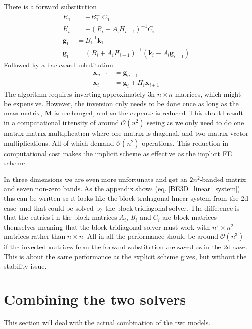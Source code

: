 There is a forward substitution
\begin{align}\label{block_tridiag_alg}
 H_1 &= -B_1^{-1}C_1\nonumber \\
 H_i &= -\left(B_i+A_iH_{i-1}\right)^{-1}C_i \nonumber \\
 \mathbf{g}_1 &= B_1^{-1}\mathbf{k}_1 \nonumber\\
 \mathbf{g}_1 &= \left(B_i+A_iH_{i-1}\right)^{-1}\left(\mathbf{k}_i-A_i\mathbf{g}_{i-1}\right)
 \end{align}
 Followed by a backward substitution
 \begin{align*}
  \mathbf{x}_{n-1} &= \mathbf{g}_{n-1}\nonumber\\
  \mathbf{x}_i &= \mathbf{g}_i + H_i\mathbf{x}_{i+1} \nonumber
 \end{align*}
The algorithm requires inverting approximately 3n $n\times n$ matrices, which might be expensive. 
However, the inversion only needs to be done once as long as the mass-matrix, $\mathbf M$ is unchanged, and so the expense is reduced. 
This should result in a computational intensity of around $\mathcal{O}(n^2)$ seeing as we only need to do one matrix-matrix multiplication where one matrix is diagonal, and two matrix-vector multiplications. 
All of which demand $\mathcal{O}(n^2)$ operations. This reduction in computational cost makes the implicit scheme as effective as the implicit FE scheme.

In three dimensions we are even more unfortunate and get an $2n^2$-banded matrix and seven non-zero bands. 
As the appendix shows (eq. \ref{BE3D_linear_system}) this can be written so it looks like the block tridiagonal linear system from the 2d case, and that could be solved by the block-tridiagonal solver. 
The difference is that the entries i n the block-matrices $A_i$, $B_i$ and $C_i$ are block-matrices themselves meaning that the block tridiagonal solver must work with $n^2\times n^2$ matrices rather than $n\times n$. 
All in all the performance should be around $\mathcal{O}(n^3)$ if the inverted matrices from the forward substitution are saved as in the 2d case. 
This is about the same performance as the explicit scheme gives, but without the stability issue.

\section{Combining the two solvers}\label{combining_the_solvers}
This section will deal with the actual combination of the two models.\\

